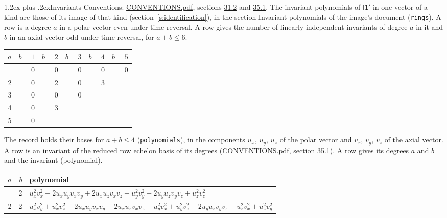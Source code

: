 \documentclass[10pt,a4paper]{article}
\makeatletter
\renewcommand\section{\@startsection{section}{1}{\z@}{-3ex plus -1ex minus -.2ex}%
  {1.2ex plus .2ex}{\normalfont\large\sffamily\bfseries\color{parttitle}}}
\numberwithin{equation}{section}
\newcommand{\grp}[1]{\mathsf{#1}}
\makeatother
\begin{document}
\section{Invariants}\label{s:invariants}
Conventions: \href{../../CONVENTIONS.pdf}{CONVENTIONS.pdf}, sections \href{../../CONVENTIONS.pdf\#conv.31.2}{31.2} and \href{../../CONVENTIONS.pdf\#conv.35.1}{35.1}.
The invariant polynomials of $\grp{I1'}$ in one vector of a kind are those of its image of that kind (section~\ref{s:identification}), in the section Invariant polynomials of the image's document (\texttt{rings}).
\leavevmode\label{n:index.degree.polar}\label{n:index.degree.axial}A row is a degree $a$ in a polar vector even under time reversal. A row gives the number of linearly independent invariants of degree $a$ in it and $b$ in an axial vector odd under time reversal, for $a + b \le 6$.
{\small\begin{longtable}{@{}rrrrrr@{}}\toprule
$a$ & $b = 1$ & $b = 2$ & $b = 3$ & $b = 4$ & $b = 5$\\\midrule\endhead
\bottomrule\endfoot\endlastfoot
1 & 0 & 0 & 0 & 0 & 0\\*
2 & 0 & 2 & 0 & 3 & \\*
3 & 0 & 0 & 0 &  & \\*
4 & 0 & 3 &  &  & \\*
5 & 0 &  &  &  & \\
\bottomrule\end{longtable}}
\leavevmode\label{n:local.component.polar}\label{n:local.component.axial}The record holds their bases for $a + b \le 4$ (\texttt{polynomials}), in the components $u_{x}$, $u_{y}$, $u_{z}$ of the polar vector and $v_{x}$, $v_{y}$, $v_{z}$ of the axial vector. \label{n:head.polynomial}A row is an invariant of the reduced row echelon basis of its degrees (\href{../../CONVENTIONS.pdf}{CONVENTIONS.pdf}, section \href{../../CONVENTIONS.pdf\#conv.35.1}{35.1}). A row gives its degrees $a$ and $b$ and the invariant (polynomial).
{\small\renewcommand{\arraystretch}{1.2}\begin{longtable}{@{}rrl@{}}\toprule
$a$ & $b$ & polynomial\\\midrule\endhead
\bottomrule\endfoot\endlastfoot
2 & 2 & $u_{x}^{2}v_{x}^{2} + 2u_{x}u_{y}v_{x}v_{y} + 2u_{x}u_{z}v_{x}v_{z} + u_{y}^{2}v_{y}^{2} + 2u_{y}u_{z}v_{y}v_{z} + u_{z}^{2}v_{z}^{2}$\\*
2 & 2 & $u_{x}^{2}v_{y}^{2} + u_{x}^{2}v_{z}^{2} - 2u_{x}u_{y}v_{x}v_{y} - 2u_{x}u_{z}v_{x}v_{z} + u_{y}^{2}v_{x}^{2} + u_{y}^{2}v_{z}^{2} - 2u_{y}u_{z}v_{y}v_{z} + u_{z}^{2}v_{x}^{2} + u_{z}^{2}v_{y}^{2}$\\
\bottomrule\end{longtable}}
\end{document}

